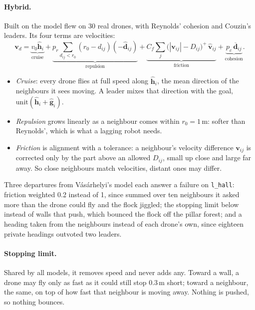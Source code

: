 \paragraph{Hybrid.} Built on the model \citet{vasarhelyi2018} flew on 30 real
drones, with
Reynolds' cohesion and Couzin's leaders. Its four terms are velocities:
\begin{equation}
  \mathbf v_d =
  \underbrace{v_0 \hat{\mathbf h}_i}_{\text{cruise}}
  + \underbrace{p_r \!\!\sum_{d_{ij} < r_0}\!\! (r_0 - d_{ij})(-\hat{\mathbf d}_{ij})}_{\text{repulsion}}
  + \underbrace{C_f \sum_j \bigl(|\mathbf v_{ij}| - D_{ij}\bigr)^{+}\, \hat{\mathbf v}_{ij}}_{\text{friction}}
  + \underbrace{p_c\, \overline{\mathbf d}_{ij}}_{\text{cohesion}}.
\end{equation}
\begin{itemize}
  \item \emph{Cruise}: every drone flies at full speed along
        $\hat{\mathbf h}_i$, the mean direction of the neighbours it sees
        moving. A leader mixes that direction with the goal,
        $\mathrm{unit}(\hat{\mathbf h}_i + \hat{\mathbf g}_i)$.
  \item \emph{Repulsion} grows linearly as a neighbour comes within
        $r_0 = 1$\,m: softer than Reynolds', which is what a lagging robot
        needs.
  \item \emph{Friction} is alignment with a tolerance: a neighbour's
        velocity difference $\mathbf v_{ij}$ is corrected only by the part
        above an allowed $D_{ij}$, small up close and large far away. So
        close neighbours match velocities, distant ones may differ.
\end{itemize}
Three departures from Vásárhelyi's model each answer a failure on
\texttt{l\_hall}: friction weighted 0.2 instead of 1, since summed over ten
neighbours it asked more than the drone could fly and the flock jiggled; the
stopping limit below instead of walls that push, which bounced the flock off
the pillar forest; and a heading taken from the neighbours instead of each
drone's own, since eighteen private headings outvoted two leaders.

\paragraph{Stopping limit.} Shared by all models, it removes speed and
never adds any. Toward a wall, a drone may fly only as fast as it could
still stop 0.3\,m short; toward a neighbour, the same, on top of how fast
that neighbour is moving away. Nothing is pushed, so nothing bounces.

